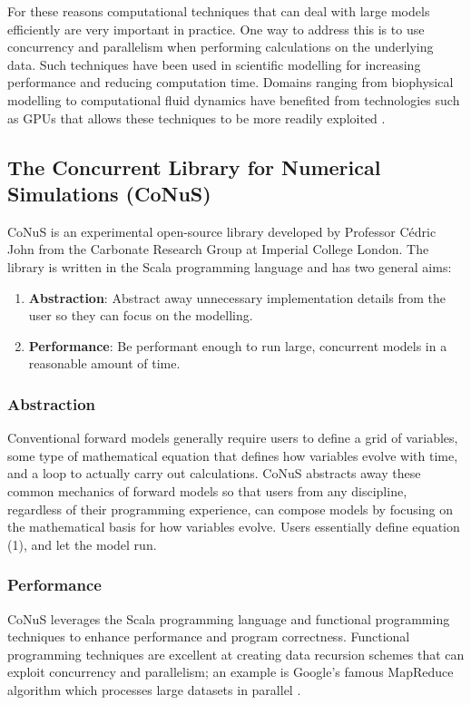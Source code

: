 \documentclass[12pt]{article}
\begin{document}
For these reasons computational techniques that can deal with large models efficiently are very important in practice. One way to address this is to use concurrency and parallelism when performing calculations on the underlying data. Such techniques have been used in scientific modelling for increasing performance and reducing computation time. Domains ranging from biophysical modelling to computational fluid dynamics have benefited from technologies such as GPUs that allows these techniques to be more readily exploited \cite{4490127}.

\subsection{The Concurrent Library for Numerical Simulations (CoNuS)}
CoNuS is an experimental open-source library developed by Professor Cédric John from the Carbonate Research Group at Imperial College London. The library is written in the Scala programming language and has two general aims:

\begin{enumerate}
\item \textbf{Abstraction}: Abstract away unnecessary implementation details from the user so they can focus on the modelling. \\
\item \textbf{Performance}: Be performant enough to run large, concurrent models in a reasonable amount of time.
\end{enumerate}

\subsubsection{Abstraction}
Conventional forward models generally require users to define a grid of variables, some type of mathematical equation that defines how variables evolve with time, and a loop to actually carry out calculations. CoNuS abstracts away these common mechanics of forward models so that users from any discipline, regardless of their programming experience, can compose models by focusing on the mathematical basis for how variables evolve. Users essentially define equation (1), and let the model run.

\subsubsection{Performance}
CoNuS leverages the Scala programming language and functional programming techniques to enhance performance and program correctness. Functional programming techniques are excellent at creating data recursion schemes that can exploit concurrency and parallelism; an example is Google's famous MapReduce algorithm which processes large datasets in parallel \cite{LAMMEL20081}. 
\end{document}
